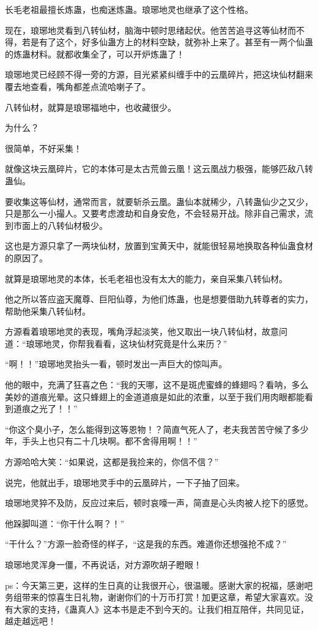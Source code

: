 \begin{this_body}
长毛老祖最擅长炼蛊，也痴迷炼蛊。琅琊地灵也继承了这个性格。

现在，琅琊地灵看到八转仙材，脑海中顿时思绪起伏。他苦苦追寻这等仙材而不得，若是有了这个，好多仙蛊方上的材料空缺，就弥补上来了。甚至有一两个仙蛊的炼蛊材料。就都收集全了，可以开炉炼蛊了！

琅琊地灵已经顾不得一旁的方源，目光紧紧纠缠手中的云凰碎片，把这块仙材翻来覆去地查看，嘴角都差点流哈喇子了。

八转仙材，就算是琅琊福地中，也收藏很少。

为什么？

很简单，不好采集！

就像这块云凰碎片，它的本体可是太古荒兽云凰！这云凰战力极强，能够匹敌八转蛊仙。

要收集这等仙材，通常而言，就要斩杀云凰。蛊仙本就稀少，八转蛊仙少之又少，只是那么一小撮人。又要考虑渡劫和自身安危，不会轻易开战。除非自己需求，流到市面上的八转仙材极少。

这也是方源只拿了一两块仙材，放置到宝黄天中，就能很轻易地换取各种仙蛊食材的原因了。

就算是琅琊地灵的本体，长毛老祖也没有太大的能力，亲自采集八转仙材。

他之所以答应盗天魔尊、巨阳仙尊，为他们炼蛊，也是想要借助九转尊者的实力，帮助他采集八转仙材。

方源看着琅琊地灵的表现，嘴角浮起淡笑，他又取出一块八转仙材，故意问道：“琅琊地灵，你帮我看看，这块仙材究竟是什么来历？”

“啊！！”琅琊地灵抬头一看，顿时发出一声巨大的惊叫声。

他的眼中，充满了狂喜之色：“我的天哪，这不是斑虎蜜蜂的蜂翅吗？看呐，多么美妙的道痕光晕。这只蜂翅上的金道道痕是如此的浓重，以至于我们用肉眼都能看到道痕之光了！！”

“你这个臭小子，怎么能得到这等恩物！？简直气死人了，老夫我苦苦守候了多少年，手头上也只有二十几块啊。都不舍得用啊！！”

方源哈哈大笑：“如果说，这都是我捡来的，你信不信？”

说完，他就出手，琅琊地灵手中的云凰碎片，一下子抽了回来。

琅琊地灵猝不及防，反应过来后，顿时哀嚎一声，简直是心头肉被人挖下的感觉。

他跺脚叫道：“你干什么啊？！”

“干什么？”方源一脸奇怪的样子，“这是我的东西。难道你还想强抢不成？”

琅琊地灵浑身一僵，不再说话，对方源吹胡子瞪眼！

ps：今天第三更，这样的生日真的让我很开心，很温暖。感谢大家的祝福，感谢吧务组带来的惊喜生日礼物，谢谢你们的十万币打赏！加更这章，希望大家喜欢。没有大家的支持，《蛊真人》这本书是走不到今天的。让我们相互陪伴，共同见证，越走越远吧！

\end{this_body}

